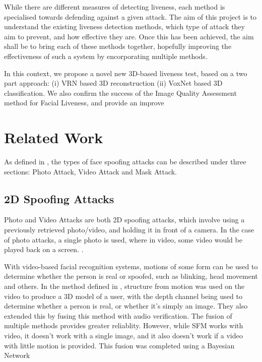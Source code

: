 \documentclass[10pt,a4paper]{article}
\begin{document}
   While there are different measures of detecting liveness, each method is specialised towards defending against a given attack. The aim of this project is to understand
   the existing liveness detection methods, which type of attack they aim to prevent, and how effective they are. Once this has been achieved, the aim shall be to bring
   each of these methods together, hopefully improving the effectiveness of such a system by encorporating multiple methods.


    In this context, we propose a novel new 3D-based liveness test, based on a two part approach: (i) VRN based 3D reconstruction (ii) VoxNet based 3D classification.
    We also confirm the success of the Image Quality Assessment method for Facial Liveness, and provide an improve

\section{Related Work}
    As defined in \cite{FaceSpoofingAttacksStudy}, the types of face spoofing attacks can be described under three sections: Photo Attack, Video Attack and Mask Attack.

    \subsection{2D Spoofing Attacks}
        Photo and Video Attacks are both 2D spoofing attacks, which involve using a previously retrieved photo/video, and holding it in front of a camera. In the case of photo attacks,
        a single photo is used, where in video, some video would be played back on a screen. \cite{FaceSpoofingAttacksStudy}.

        With video-based facial recognition systems, motions of some form can be used to determine whether the person is real or spoofed, such as blinking, head movement and others.
        In the method defined in \cite{SFMClassifier}, structure from motion was used on the video to produce a 3D model of a user, with the depth channel being used to determine whether a person is real, or whether it's simply an image.
        They also extended this by fusing this method with audio verification. The fusion of multiple methods provides greater reliablity. However, while SFM works with video, it doesn't work with a single image,
        and it also doesn't work if a video with little motion is provided. This fusion was completed using a Bayesian Network 
\end{document}

